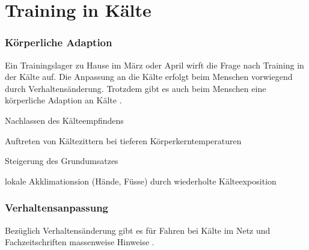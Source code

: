 \documentclass[a4paper,DIV13,BCOR0cm,draft=TRUE]{scrartcl}
\newcommand{\Tlzh}{Trainingslager zu Hause}
\begin{document}
\section{Training in Kälte}

\subsubsection{Körperliche Adaption}
Ein \Tlzh{} im März oder April wirft die Frage nach Training in der Kälte auf.
Die Anpassung an die Kälte erfolgt beim Menschen vorwiegend durch Verhaltensänderung.
Trotzdem gibt es auch beim Menschen eine körperliche Adaption an Kälte \cite[S. 1032]{Weineck2010}.

\begin{itemize*}
        \item Nachlassen des Kälteempfindens
        \item Auftreten von Kältezittern bei tieferen Körperkerntemperaturen
        \item Steigerung des Grundumsatzes
        \item lokale Akklimationsion (Hände, Füsse) durch wiederholte Kälteexposition
\end{itemize*}

\subsubsection{Verhaltensanpassung}

Bezüglich Verhaltensänderung gibt es für Fahren bei Kälte im Netz und Fachzeitschriften massenweise Hinweise
\cite{Thomas2009rennradbuch, gcn2011winter,gcn2015winter, gcn2015wintermistakes,beck2015frostschutz}.
\end{document}

